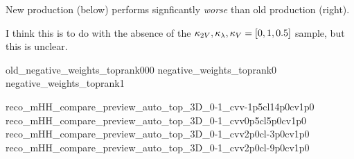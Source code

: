 { \tiny
    New production (below) performs signficantly \textit{worse} than old production (right).
    \vspace{3mm}

    I think this is to do with the absence of the $\kappa_{2V},\kappa_{\lambda},\kappa_{V} = [0, 1, 0.5]$ sample, but this is unclear.
}
{old_negative_weights_toprank000}
{negative_weights_toprank0}
{negative_weights_toprank1}

{reco_mHH_compare_preview_auto_top_3D_0-1_cvv-1p5cl14p0cv1p0}
{reco_mHH_compare_preview_auto_top_3D_0-1_cvv0p5cl5p0cv1p0}
{reco_mHH_compare_preview_auto_top_3D_0-1_cvv2p0cl-3p0cv1p0}
{reco_mHH_compare_preview_auto_top_3D_0-1_cvv2p0cl-9p0cv1p0}
